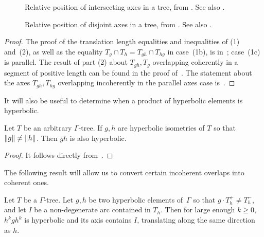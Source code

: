 \begin{figure}[ht]
     \centering
{}
    \caption{Relative position of intersecting axes in a tree, from
      \cite[Fig.\ 3]{Pa89:Paulin1989TheGT}. See also \cite{CM87:GroupActions}.}
    \label{fig:trees_intersection}
\end{figure}
\begin{figure}[ht]
     \centering
{}
    \caption{Relative position of disjoint axes in a tree, from
      \cite[Fig.\ 2]{Pa89:Paulin1989TheGT}. See also \cite{CM87:GroupActions}.}\label{fig:trees_disjoint}
\end{figure}


\begin{proof}
The proof of the translation length equalities and inequalities of (1)
and~(2),
as well as the equality $T_g \cap T_h = T_{gh} \cap T_{hg}$
in case~(1b), is in~\cite[Sections~1.5, 1.8 and the proof of Lemma~3.4]{CM87:GroupActions};
case~(1c) is parallel.
The result of part (2) about $T_{gh}, T_g$ overlapping coherently in a segment of positive length can be found in the proof of~\cite[Theorem~2.7]{CM87:GroupActions}.
The statement about the axes $T_{gh},T_{hg}$ overlapping incoherently in the parallel axes case is~\cite[Remark~3.5]{CM87:GroupActions}.
\end{proof}

It will also be useful to determine when a product of hyperbolic elements is hyperbolic.

\begin{lemma}\label{lem:product_hyperbolic}
    Let $T$ be an arbitrary $\Gamma$-tree.
    If $g,h$ are hyperbolic isometries of $T$ so that $\lVert g \rVert \neq \lVert h \rVert$. Then $gh$ is also hyperbolic.
\end{lemma}
\begin{proof}
It follows directly from~\cite[Proposition~1.6]{Pa89:Paulin1989TheGT}.
\end{proof}

The following result will allow us to convert certain incoherent overlaps into coherent ones.

\begin{lemma}
Let $T$ be a $\Gamma$-tree.
Let $g,h$ be two hyperbolic elements of~$\Gamma$ so that
$g \cdot T_h^+ \neq T_h^-$, and let $I$ be a non-degenerate arc contained
in $T_h$. Then for large enough $k \geq 0$, $h^k g h^k$ is hyperbolic
and its axis contains $I$, translating along the same direction as $h$.
\label{lem:make_coherent}
\end{lemma}

